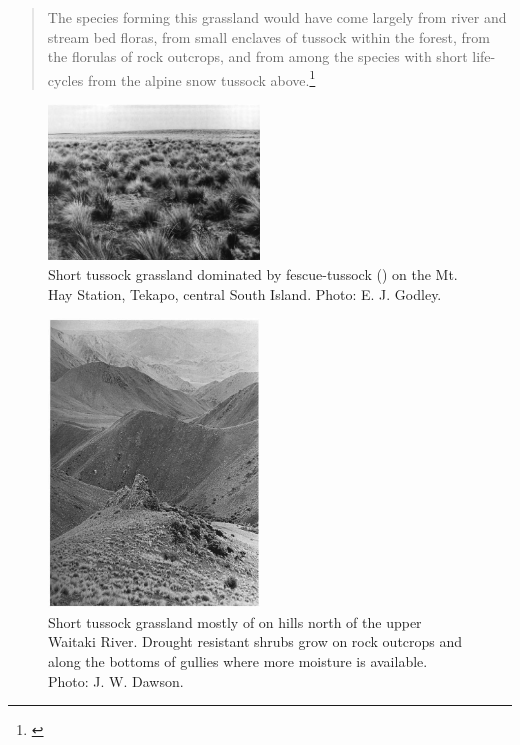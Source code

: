 \begin{quote}
	The species forming this grassland would have come largely from river and stream bed floras, from small enclaves of tussock within the forest, from the florulas of rock outcrops, and from among the species with short life-cycles from the alpine snow tussock above.\footnote{\cite{connor1969montane}}
\end{quote}

\begin{figure}
	\includegraphics[width=0.5\textwidth]{graphics/figure81short-tussock.jpg}
	\centering
	\caption[Short tussock grassland dominated by fescue-tussock]{Short tussock grassland dominated by fescue-tussock () on the Mt.
	Hay Station, Tekapo, central South Island.
	Photo:  E. J. Godley.}%
	\label{fig:81short-tussock}
\end{figure}

\begin{figure}
	\includegraphics[width=0.5\textwidth]{graphics/figure82short-tussock.jpg}
	\centering
	\caption[Short tussock grassland mostly of \emph{Festuca novae-zelandiae}]{Short tussock grassland mostly of  on hills north of the upper Waitaki River.
	Drought resistant shrubs grow on rock outcrops and along the bottoms of gullies where more moisture is available.  Photo:  J. W. Dawson.}%
	\label{fig:82short-tussock}
\end{figure}

